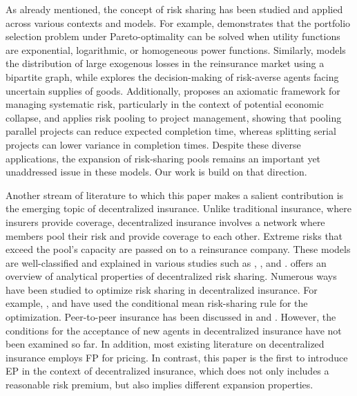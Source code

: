 \documentclass[fleqn,mnsc,nonblindrev]{informs4}
\begin{document}
As already mentioned, the concept of risk sharing has been studied and applied across various contexts and models. For example, \cite{pratt2000efficient} demonstrates that the portfolio selection problem under Pareto-optimality can be solved when utility functions are exponential, logarithmic, or homogeneous power functions. Similarly, \cite{kley2016risk} models the distribution of large exogenous losses in the reinsurance market using a bipartite graph, while \cite{ferris2022dynamic} explores the decision-making of risk-averse agents facing uncertain supplies of goods. Additionally, \cite{chen2013axiomatic} proposes an axiomatic framework for managing systematic risk, particularly in the context of potential economic collapse, and \cite{gutierrez2000analysis} applies risk pooling to project management, showing that pooling parallel projects can reduce expected completion time, whereas splitting serial projects can lower variance in completion times. Despite these diverse applications, the expansion of risk-sharing pools remains an important yet unaddressed issue in these models. Our work is build on that direction. 









Another stream of literature to which this paper makes a salient contribution is the emerging topic of decentralized insurance. Unlike traditional insurance, where insurers provide coverage, decentralized insurance involves a network where members pool their risk and provide coverage to each other. Extreme risks that exceed the pool's capacity are passed on to a reinsurance company. These models are well-classified and explained in various studies such as \cite{abdikerimova2022peer}, \cite{denuit2020investing}, and \cite{denuit2021risk}. \cite{denuit2022risk} offers an overview of analytical properties of decentralized risk sharing. Numerous ways have been studied to optimize risk sharing in decentralized insurance. For example, %
\cite{denuit2021stop}, and \cite{denuit2023risk} have used the conditional mean risk-sharing rule for the optimization. Peer-to-peer insurance has been discussed in \cite{FenLiuTay} and \cite{AbdBooFen}. However, the conditions for the acceptance of new agents in decentralized insurance have not been examined so far. In addition, most existing literature on decentralized insurance employs FP for pricing. In contrast, this paper is the first to introduce EP in the context of decentralized insurance, which does not only includes a reasonable risk premium, but also implies different expansion properties.
\end{document}
